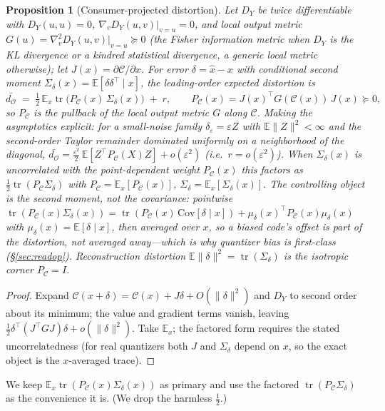 \documentclass[11pt]{article}
\newtheorem{proposition}{Proposition}
\theoremstyle{definition}
\theoremstyle{remark}
\newcommand{\PC}{P_{\mathcal{C}}}
\newcommand{\Sd}{\Sigma_{\delta}}
\newcommand{\tr}{\operatorname{tr}}
\newcommand{\dO}{d_{\mathcal{O}}}
\newcommand{\E}{\mathbb{E}}
\begin{document}
\begin{proposition}[Consumer-projected distortion]\label{prop:main}
Let $D_Y$ be twice differentiable with $D_Y(u,u)=0$, $\nabla_v D_Y(u,v)|_{v=u}=0$,
and \emph{local output metric} $G(u)=\nabla^2_v D_Y(u,v)|_{v=u}\succeq0$ (the Fisher
information metric when $D_Y$ is the KL divergence or a kindred statistical
divergence, a generic local metric otherwise); let
$J(x)=\partial\mathcal{C}/\partial x$. For error $\delta=\hat x-x$ with conditional
\emph{second moment} $\Sd(x)=\E[\delta\delta^\top\mid x]$, the leading-order expected
distortion is
\[
\bar{\dO} \;=\; \tfrac12\,\E_x\tr\!\big(\PC(x)\,\Sd(x)\big)\;+\;r,
\qquad \PC(x)=J(x)^\top G(\mathcal{C}(x))\,J(x)\succeq0 ,
\]
so $\PC$ is the pullback of the local output metric $G$ along $\mathcal{C}$. Making
the asymptotics explicit: for a small-noise family $\delta_\varepsilon=\varepsilon Z$
with $\E\|Z\|^2<\infty$ and the second-order Taylor remainder dominated uniformly on a
neighborhood of the diagonal, $\bar{\dO}=\tfrac{\varepsilon^2}{2}\,\E[Z^\top\PC(X)Z]
+o(\varepsilon^2)$ (i.e.\ $r=o(\varepsilon^2)$).
When $\Sd(x)$ is uncorrelated with the point-dependent weight $\PC(x)$ this factors
as $\tfrac12\tr(\PC\Sd)$ with $\PC=\E_x[\PC(x)]$, $\Sd=\E_x[\Sd(x)]$. The controlling
object is the \emph{second} moment, not the covariance: pointwise
$\tr(\PC(x)\Sd(x))=\tr(\PC(x)\,\mathrm{Cov}[\delta\mid x])+\mu_\delta(x)^\top\PC(x)
\mu_\delta(x)$ with $\mu_\delta(x)=\E[\delta\mid x]$, then averaged over $x$, so a
biased code's offset is \emph{part} of the distortion, not averaged away---which is
why quantizer bias is first-class (\S\ref{sec:readop}). Reconstruction distortion
$\E\|\delta\|^2=\tr(\Sd)$ is the \emph{isotropic} corner $\PC=I$.
\end{proposition}
\begin{proof}
Expand $\mathcal{C}(x+\delta)=\mathcal{C}(x)+J\delta+O(\|\delta\|^2)$ and $D_Y$ to
second order about its minimum; the value and gradient terms vanish, leaving
$\tfrac12\delta^\top(J^\top GJ)\delta+o(\|\delta\|^2)$. Take $\E_x$; the factored
form requires the stated uncorrelatedness (for real quantizers both $J$ and $\Sd$
depend on $x$, so the exact object is the $x$-averaged trace).
\end{proof}

We keep $\E_x\tr(\PC(x)\Sd(x))$ as primary and use the factored $\tr(\PC\Sd)$ as the
convenience it is. (We drop the harmless $\tfrac12$.)
\end{document}
